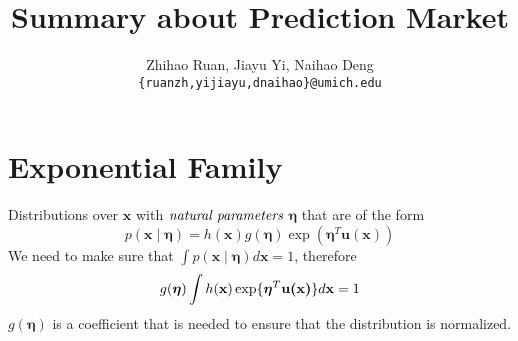 \documentclass[12pt]{article}
\title{\textbf{Summary about Prediction Market}}
\author{Zhihao Ruan, Jiayu Yi, Naihao Deng\\\texttt{\{ruanzh,yijiayu,dnaihao\}@umich.edu}}
\begin{document}
\maketitle
\tableofcontents


\newpage
\section{Exponential Family}
Distributions over $\textbf{x}$ with $\emph{natural parameters}$ $\bm{\eta}$ that are of the form
\begin{equation}\label{eq:expo_fam}
p(\textbf{x}\mid\bm{\eta})=h(\mathbf{x})g(\bm{\eta})\exp(\bm{\eta}^T\textbf{u}(\textbf{x}))
\end{equation}
We need to make sure that
$\int{p(\textbf{x}\mid\bm{\eta})}d\bm{x}=1$, therefore 
\begin{equation}\label{eq:normalize}
g(\bm{\eta})\int{h(\textbf{x})\exp\{\bm{\eta}^T\textbf{u(\textbf{x})}\}}d\textbf{x}=1
\end{equation}
$g(\bm{\eta})$ is a coefficient that is needed to ensure that the distribution is normalized.
\end{document}
